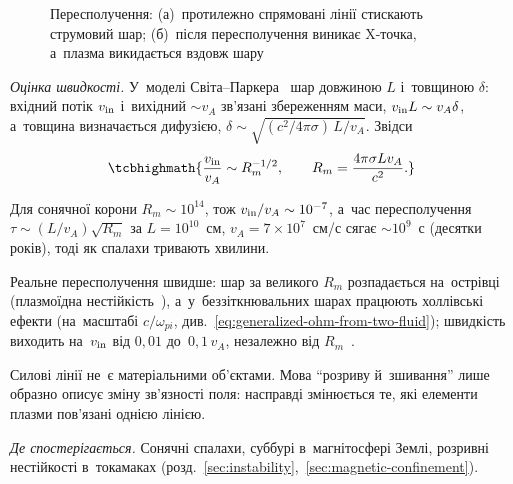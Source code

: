 \begin{figure}[ht]\centering
	\caption{Пересполучення: (а)~протилежно спрямовані лінії стискають струмовий шар; (б)~після пересполучення виникає X-точка, а~плазма викидається вздовж шару}
	\label{pic:reconnection}
\end{figure}

\emph{Оцінка швидкості.} У~моделі Світа--Паркера~\cite{parker1957sweet,priest2000reconnection,chen2016introduction} шар довжиною $L$ і~товщиною $\delta$: вхідний потік $v_{\rm in}$ і~вихідний $\sim v_A$ зв'язані збереженням маси,
$v_{\rm in}L\sim v_A\delta$, а~товщина визначається дифузією, $\delta\sim\sqrt{(c^2/4\pi\sigma)\,L/v_A}$. Звідси
\begin{equation}\label{eq:sweet-parker}
	\tcbhighmath{\frac{v_{\rm in}}{v_A}\sim R_{m}^{-1/2},\qquad R_m=\frac{4\pi\sigma Lv_A}{c^2}.}
\end{equation}
\begin{Estimate}
Для сонячної корони $R_m\sim10^{14}$, тож $v_{\rm in}/v_A\sim10^{-7}$, а~час пересполучення $\tau\sim(L/v_A)\sqrt{R_m}$ за $L=10^{10}$~см,
$v_A=7\times10^{7}$~см/с сягає $\sim10^{9}$~с (десятки років), тоді як спалахи тривають хвилини.
\end{Estimate}

Реальне пересполучення швидше: шар за великого $R_m$ розпадається на~острівці (плазмоїдна нестійкість~\cite{loureiro2007plasmoid}),
а~у~беззіткнювальних шарах працюють холлівські ефекти (на~масштабі $c/\omega_{pi}$, див.~\eqref{eq:generalized-ohm-from-two-fluid}); швидкість виходить на~$v_{\rm in}$ від $0{,}01$ до~$0{,}1\,v_A$, незалежно від $R_m$~\cite{priest2000reconnection,yamada2010magnetic}.

\begin{Attention}
	Силові лінії не~є матеріальними об'єктами. Мова \enquote{розриву й~зшивання} лише образно описує зміну зв'язності поля: насправді змінюється те,
	які елементи плазми пов'язані однією лінією.
\end{Attention}

\emph{Де спостерігається.} Сонячні спалахи, суббурі в~магнітосфері Землі, розривні нестійкості в~токамаках (розд.~\ref{sec:instability},~\ref{sec:magnetic-confinement}).


